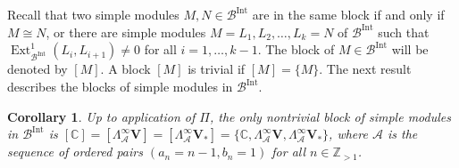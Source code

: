\documentclass[12pt]{amsart}
\newcommand\C{\mathbb{C}}
\newcommand\Z{\mathbb{Z}}
\newcommand\cA{\mathcal{A}}
\newcommand\cB{\mathcal{B}}
\newcommand\bV{\mathbf{V}}
\DeclareMathOperator{\Ext}{Ext}
\DeclareMathOperator{\Int}{Int}
\theoremstyle{plain}
\newtheorem{cor}[theo]{Corollary}
\theoremstyle{definition}
\numberwithin{equation}{section}
\begin{document}
Recall that two simple modules $M,N\in \cB^{\Int}$ are in the same block if and only if $M\cong N$, or there are simple modules $M=L_1, L_2, \ldots, L_k=N$ of $\cB^{\Int}$ such that $\Ext_{\cB^{\Int}}^1(L_i, L_{i+1})\neq 0$ for all $i=1,\ldots, k-1$. The block of $M\in \cB^{\Int}$ will be denoted by $[M]$. A block $[M]$ is trivial if $[M]=\{M\}$. The next result describes the blocks of simple modules in $\cB^{\Int}$.

\begin{cor}
Up to application of $\Pi$, the only nontrivial block of simple modules in $\cB^{\Int}$ is $[\C] = [\Lambda_\cA^\infty \bV] = [\Lambda_\cA^\infty \bV_*] = \{\C, \Lambda_\cA^\infty \bV, \Lambda_\cA^\infty \bV_*\}$, where $\cA $ is the sequence of ordered pairs $(a_n = n-1, b_n = 1)$ for all $n\in \Z_{>1}$.
\end{cor}
\end{document}
